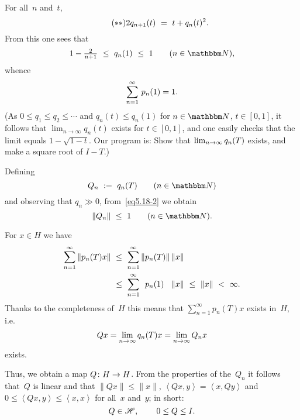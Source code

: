 \documentclass[main.tex]{subfiles}
\begin{document}
\begin{psec}{5.18}
\begin{enumerate}
For all~$n$ and~$t$,
\begin{equation*}
\tag{$**$} \label{eq5.18-3}
2 q_{n+1}(t)\ =\ t+q_n(t)^2\text{.}
\end{equation*}
From this one sees that
\begin{equation*}
1-{\textstyle\frac{2}{n+1}}\ \leq\ q_n(1)\ \leq\ 1
\qquad(n\in \N)\htam{,}
\end{equation*}
whence
\begin{equation*}
\sum_{n=1}^{\infty}\, p_n(1)=1\text{.}
\end{equation*}
(As $0\leq q_1\leq q_2\leq \dotsb$ 
and $q_n(t)\leq q_n(1)$ for $n\in\N$, $t\in[0,1]$,
it follows that $\lim_{n\rightarrow\infty} q_n(t)$
exists for $t\in[0,1]$,
and one easily checks that the limit equals $1-\sqrt{1-t}$.
Our program is:
Show that $\lim_{n\rightarrow\infty} q_n(T)$ exists,
and make a square root of $I-T$.)

Defining
\begin{equation*}
Q_n\ :=\ q_n(T)\qquad(n\in\N)
\end{equation*}
and observing that $q_n\gg 0$,
from~\eqref{eq5.18-2} we obtain
\begin{equation*}
\|Q_n\|\ \leq\ 1\qquad (n\in \N)\htam{.}
\end{equation*}

For $x\in H$ we have
\begin{alignat*}{2}
\sum_{n=1}^\infty \|p_n(T)x\|\ 
&\leq\ \sum_{n=1}^\infty \|p_n(T)\|\,\|x\|\\
&\leq\ \sum_{n=1}^\infty \phantom{\|}
p_n(\lsub{1)}{T)}\phantom{\|}\,\|x\|\ \leq\ \|x\|\ <\ \infty\htam{.}
\end{alignat*}
Thanks to the completeness of~$H$
this means that $\sum_{n=1}^{\infty} p_n(T) x$
exists in~$H$, i.e. 
\begin{equation*}
Qx=\lim_{n\rightarrow\infty} q_n(T)x=\lim_{n\rightarrow\infty}Q_n x
\end{equation*}
exists.

Thus,
we obtain a map $Q\colon H\rightarrow H$.
From the properties of the~$Q_n$
it follows that~$Q$ is linear
and that $\|Qx\|\leq\|x\|$,
$\left<Qx,y\right>=\left<x,Qy\right>$
and $0\leq\left<Qx,y\right>\leq\left<x,x\right>$
for all~$x$ and~$y$;
in short:
\begin{equation*}
Q\in\mathscr H\text{, }\qquad 0\leq Q\leq I\text{.}
\end{equation*}


\end{enumerate}
\end{psec}
\end{document}
